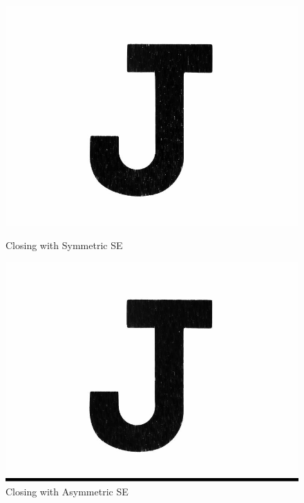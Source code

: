 \documentclass{article}
\begin{document}
\begin{figure}[ht!]
  \begin{minipage}[b]{0.5\linewidth}
    \centering
    \includegraphics[width=.95\linewidth]{closSym.jpg} 
    \caption{Closing with Symmetric SE} 
    \vspace{4ex}
  \end{minipage}%
  \begin{minipage}[b]{0.5\linewidth}
    \centering
    \includegraphics[width=.95\linewidth]{closAsym.jpg} 
    \caption{Closing with Asymmetric SE} 
    \vspace{4ex}
  \end{minipage} 
\end{figure}
\vspace{5mm}
\end{document}
